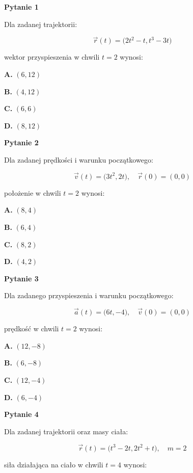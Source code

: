 \documentclass[11pt,a4paper]{article}
\begin{document}
{\LARGE\textbf{Pytanie 1}}

Dla zadanej trajektorii:

\[
\vec r(t) = \bigl(2t^2 - t, t^3 - 3t\bigr)
\]

wektor przyspieszenia w chwili $t=2$ wynosi:

\vspace{0.5em}

{\large
\textbf{A.} $(6, 12)$

\textbf{B.} $(4, 12)$

\textbf{C.} $(6, 6)$

\textbf{D.} $(8, 12)$
}

\newpage

{\LARGE\textbf{Pytanie 2}}

Dla zadanej prędkości i warunku początkowego:

\[
\vec v(t) = \bigl(3t^2, 2t\bigr), \quad \vec r(0)=(0,0)
\]

położenie w chwili $t=2$ wynosi:

\vspace{0.5em}

{\large
\textbf{A.} $(8, 4)$

\textbf{B.} $(6, 4)$

\textbf{C.} $(8, 2)$

\textbf{D.} $(4, 2)$
}

\newpage

{\LARGE\textbf{Pytanie 3}}

Dla zadanego przyspieszenia i warunku początkowego:

\[
\vec a(t) = \bigl(6t, -4\bigr), \quad \vec v(0)=(0,0)
\]

prędkość w chwili $t=2$ wynosi:

\vspace{0.5em}

{\large
\textbf{A.} $(12, -8)$

\textbf{B.} $(6, -8)$

\textbf{C.} $(12, -4)$

\textbf{D.} $(6, -4)$
}

\newpage

{\LARGE\textbf{Pytanie 4}}

Dla zadanej trajektorii oraz masy ciała:

\[
\vec r(t) = \bigl(t^3 - 2t, 2t^2 + t\bigr), \quad m = 2
\]

siła działająca na ciało w chwili $t=4$ wynosi:

\vspace{0.5em}
\end{document}
